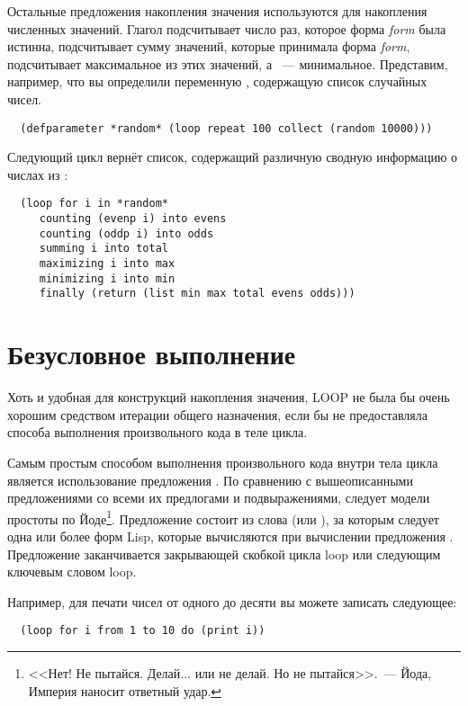 Остальные предложения накопления значения используются для накопления численных
значений. Глагол  подсчитывает число раз, которое форма \textit{form} была
истинна,  подсчитывает сумму значений, которые принимала форма \textit{form},
 подсчитывает максимальное из этих значений, а ~---
минимальное. Представим, например, что вы определили переменную ,
содержащую список случайных чисел.

\begin{lstlisting}
  (defparameter *random* (loop repeat 100 collect (random 10000)))
\end{lstlisting}

Следующий цикл вернёт список, содержащий различную сводную информацию о числах из
:

\begin{lstlisting}
  (loop for i in *random*
     counting (evenp i) into evens
     counting (oddp i) into odds
     summing i into total
     maximizing i into max
     minimizing i into min
     finally (return (list min max total evens odds)))
\end{lstlisting}

\section{Безусловное выполнение}

Хоть и удобная для конструкций накопления значения, LOOP не была бы очень хорошим
средством итерации общего назначения, если бы не предоставляла способа выполнения
произвольного кода в теле цикла.

Самым простым способом выполнения произвольного кода внутри тела цикла является
использование предложения . По сравнению с вышеописанными предложениями со всеми
их предлогами и подвыражениями,  следует модели простоты по Йоде\footnote{<<Нет!
  Не пытайся. Делай... или не делай. Но не пытайся>>.~--- Йода, Империя наносит ответный
  удар.}. Предложение  состоит из слова  (или ), за которым
следует одна или более форм Lisp, которые вычисляются при вычислении предложения
. Предложение  заканчивается закрывающей скобкой цикла loop или
следующим ключевым словом loop.

Например, для печати чисел от одного до десяти вы можете записать следующее:

\begin{lstlisting}
  (loop for i from 1 to 10 do (print i))
\end{lstlisting}

